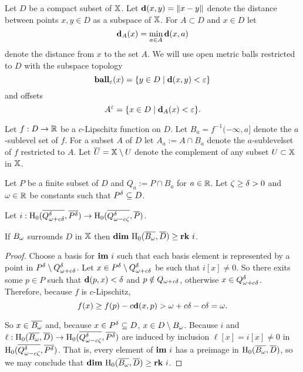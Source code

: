 
Let $D$ be a compact subset of $\X$.
Let $\dist(x, y) = \|x - y\|$ denote the distance between points $x,y\in D$ as a subspace of $\X$.
For $A\subset D$ and $x\in D$ let
\[\dist_A(x) = \min_{a\in A}\dist(x, a)\]
denote the distance from $x$ to the set $A$.
We will use open metric balls restricted to $D$ with the subspace topology
\[\ball_\e(x) = \{y\in D\mid \dist(x, y) < \e\}\]
and offsets
\[A^\e = \{x\in D\mid \dist_A(x) < \e\}.\]

Let $f : D\to \R$ be a $c$-Lipschitz function on $D$.
Let $B_a = f^{-1}(-\infty, a]$ denote the $a$-sublevel set of $f$.
For a subset $A$ of $D$ let $A_a := A\cap B_a$ denote the $a$-sublevelset of $f$ restricted to $A$.
Let $\overline{U} = \X\setminus U$ denote the complement of any subset $U\subset \X$ in $\X$.

Let $P$ be a finite subset of $D$ and $Q_a := P\cap B_a$ for $a\in\R$.
Let $\zeta\geq\of > 0 $ and $\omega\in \R$ be constants such that $\P\subseteq D$.

\begin{lemma}\label{lem:psurj}
  Let $i : \hom_0(\cmp{\QQ^\of}, \cmp{\P})\to \hom_0(\cmp{\Q^\of}, \cmp{P})$.

  If $\B$ surrounds $D$ in $\X$ then $\dim~\hom_0(\cmp{\B}, \cmp{D})\geq \rk~i$.
\end{lemma}
\begin{proof}
  Choose a basis for $\im~i$ such that each basis element is represented by a point in $\P\setminus \QQ^\of$.
  Let $x\in \P\setminus \QQ^\of$ be such that $i[x] \neq 0$.
  So there exits some $p\in P$ such that $\dist(p, x) < \delta$ and $p\notin \QQ$, otherwise $x\in\QQ^\of$.
  Therefore, because $f$ is $c$-Lipschitz,
  \[ f(x)\geq f(p) - c\dist(x, p) > \fenn - c\of =\omega.\]

  So $x\in\cmp{\B}$ and, because $x\in \P\subseteq D$, $x\in D\setminus \B$.
  Because $i$ and $\ell : \hom_0(\cmp{\B}, \cmp{D})\to \hom_0(\cmp{\Q^\of}, \cmp{\P})$ are induced by inclusion $\ell[x] = i[x]\neq 0$ in $\hom_0(\cmp{\Q^\of}, \cmp{\P})$.
  That is, every element of $\im~i$ has a preimage in $\hom_0(\cmp{\B}, \cmp{D})$, so we may conclude that $\dim~\hom_0(\cmp{\B}, \cmp{D})\geq \rk~i$.
\end{proof}

